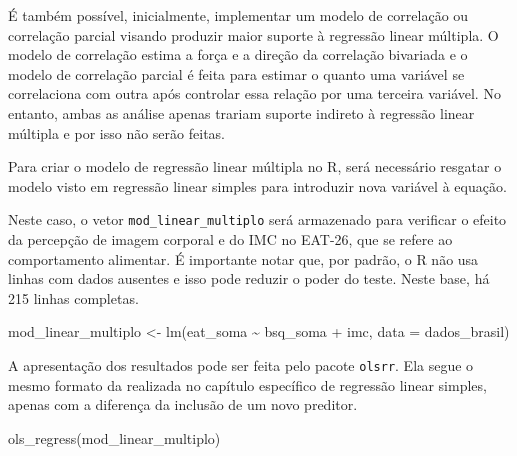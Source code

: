 \documentclass[
]{book}
\newenvironment{Shaded}{\begin{snugshade}}{\end{snugshade}}
\newcommand{\AttributeTok}[1]{\textcolor[rgb]{0.77,0.63,0.00}{#1}}
\newcommand{\FunctionTok}[1]{\textcolor[rgb]{0.00,0.00,0.00}{#1}}
\newcommand{\NormalTok}[1]{#1}
\newcommand{\OtherTok}[1]{\textcolor[rgb]{0.56,0.35,0.01}{#1}}
\newcommand{\SpecialCharTok}[1]{\textcolor[rgb]{0.00,0.00,0.00}{#1}}
\begin{document}
É também possível, inicialmente, implementar um modelo de correlação ou correlação parcial visando produzir maior suporte à regressão linear múltipla. O modelo de correlação estima a força e a direção da correlação bivariada e o modelo de correlação parcial é feita para estimar o quanto uma variável se correlaciona com outra após controlar essa relação por uma terceira variável. No entanto, ambas as análise apenas trariam suporte indireto à regressão linear múltipla e por isso não serão feitas.

Para criar o modelo de regressão linear múltipla no R, será necessário resgatar o modelo visto em regressão linear simples para introduzir nova variável à equação.

Neste caso, o vetor \texttt{mod\_linear\_multiplo} será armazenado para verificar o efeito da percepção de imagem corporal e do IMC no EAT-26, que se refere ao comportamento alimentar. É importante notar que, por padrão, o R não usa linhas com dados ausentes e isso pode reduzir o poder do teste. Neste base, há 215 linhas completas.

\begin{Shaded}
\begin{Highlighting}[]
\NormalTok{mod\_linear\_multiplo }\OtherTok{\textless{}{-}} \FunctionTok{lm}\NormalTok{(eat\_soma }\SpecialCharTok{\textasciitilde{}}\NormalTok{ bsq\_soma }\SpecialCharTok{+}\NormalTok{ imc, }\AttributeTok{data =}\NormalTok{ dados\_brasil)}
\end{Highlighting}
\end{Shaded}

A apresentação dos resultados pode ser feita pelo pacote \texttt{olsrr}. Ela segue o mesmo formato da realizada no capítulo específico de regressão linear simples, apenas com a diferença da inclusão de um novo preditor.

\begin{Shaded}
\begin{Highlighting}[]
\FunctionTok{ols\_regress}\NormalTok{(mod\_linear\_multiplo)}
\end{Highlighting}
\end{Shaded}
\end{document}
